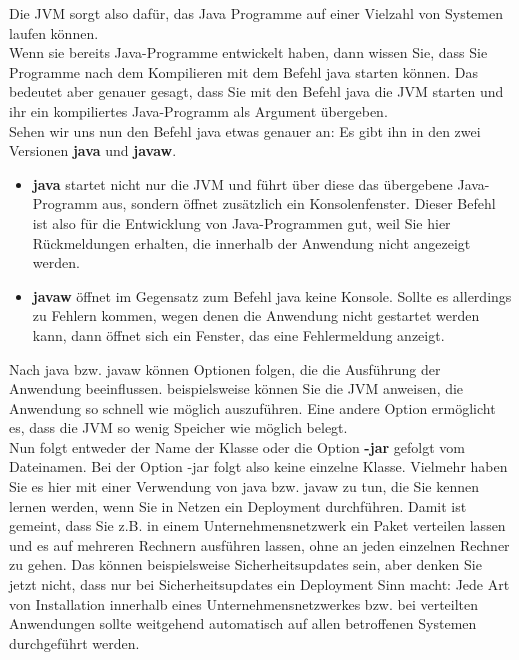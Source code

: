 Die JVM sorgt also dafür, das Java Programme auf einer Vielzahl von Systemen laufen können.\\

Wenn sie bereits Java-Programme entwickelt haben, dann wissen Sie, dass Sie Programme nach dem Kompilieren mit dem Befehl java starten können. Das bedeutet aber genauer gesagt, dass Sie mit den Befehl java die JVM starten und ihr ein kompiliertes Java-Programm als Argument übergeben.\\

Sehen wir uns nun den Befehl java etwas genauer an: Es gibt ihn in den zwei Versionen \textbf{java} und \textbf{javaw}.

\begin{itemize}
	
	\item \textbf{java} startet nicht nur die JVM und führt über diese das übergebene Java-Programm aus, sondern öffnet zusätzlich ein Konsolenfenster. Dieser Befehl ist also für die Entwicklung von Java-Programmen gut, weil Sie hier Rückmeldungen erhalten, die innerhalb der Anwendung nicht angezeigt werden.
	
	\item \textbf{javaw} öffnet im Gegensatz zum Befehl java keine Konsole. Sollte es allerdings zu Fehlern kommen, wegen denen die Anwendung nicht gestartet werden kann, dann öffnet sich ein Fenster, das eine Fehlermeldung anzeigt.
	
\end{itemize}

Nach java bzw. javaw können Optionen folgen, die die Ausführung der Anwendung beeinflussen. beispielsweise können Sie die JVM anweisen, die Anwendung so schnell wie möglich auszuführen. Eine andere Option ermöglicht es, dass die JVM so wenig Speicher wie möglich belegt.\\

Nun folgt entweder der Name der Klasse oder die Option \textbf{-jar} gefolgt vom Dateinamen. Bei der Option -jar folgt also keine einzelne Klasse. Vielmehr haben Sie es hier mit einer Verwendung von java bzw. javaw zu tun, die Sie kennen lernen werden, wenn Sie in Netzen ein Deployment durchführen. Damit ist gemeint, dass Sie z.B. in einem Unternehmensnetzwerk ein Paket verteilen lassen und es auf mehreren Rechnern ausführen lassen, ohne an jeden einzelnen Rechner zu gehen. Das können beispielsweise Sicherheitsupdates sein, aber denken Sie jetzt nicht, dass nur bei Sicherheitsupdates ein Deployment Sinn macht: Jede Art von Installation innerhalb eines Unternehmensnetzwerkes bzw. bei verteilten Anwendungen sollte weitgehend automatisch auf allen betroffenen Systemen durchgeführt werden.

